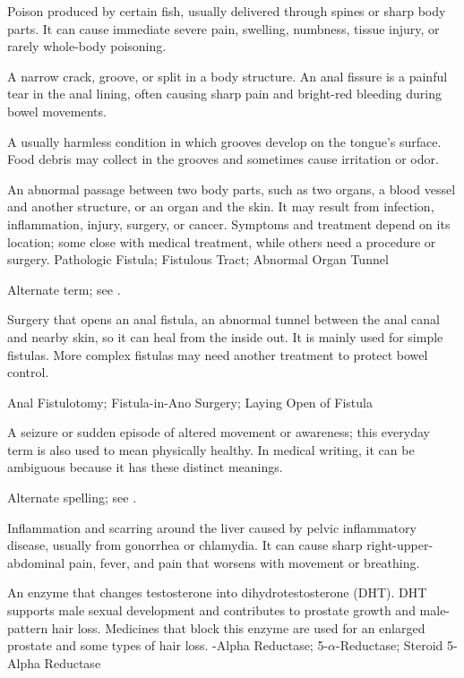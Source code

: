  Poison produced by certain fish, usually delivered through spines or sharp body parts. It can cause immediate severe pain, swelling, numbness, tissue injury, or rarely whole-body poisoning.

 A narrow crack, groove, or split in a body structure. An anal fissure is a painful tear in the anal lining, often causing sharp pain and bright-red bleeding during bowel movements.

 A usually harmless condition in which grooves develop on the tongue’s surface. Food debris may collect in the grooves and sometimes cause irritation or odor.

 An abnormal passage between two body parts, such as two organs, a blood vessel and another structure, or an organ and the skin. It may result from infection, inflammation, injury, surgery, or cancer. Symptoms and treatment depend on its location; some close with medical treatment, while others need a procedure or surgery.
\synonyms
Pathologic Fistula; Fistulous Tract; Abnormal Organ Tunnel

 Alternate term; see .

 Surgery that opens an anal fistula, an abnormal tunnel between the anal canal and nearby skin, so it can heal from the inside out. It is mainly used for simple fistulas. More complex fistulas may need another treatment to protect bowel control.

\synonyms
Anal Fistulotomy; Fistula-in-Ano Surgery; Laying Open of Fistula

 A seizure or sudden episode of altered movement or awareness; this everyday term is also used to mean physically healthy. In medical writing, it can be ambiguous because it has these distinct meanings.

 Alternate spelling; see .

 Inflammation and scarring around the liver caused by pelvic inflammatory disease, usually from gonorrhea or chlamydia. It can cause sharp right-upper-abdominal pain, fever, and pain that worsens with movement or breathing.

 An enzyme that changes testosterone into dihydrotestosterone (DHT). DHT supports male sexual development and contributes to prostate growth and male-pattern hair loss. Medicines that block this enzyme are used for an enlarged prostate and some types of hair loss.
-Alpha Reductase; 5-$\alpha$-Reductase; Steroid 5-Alpha Reductase

